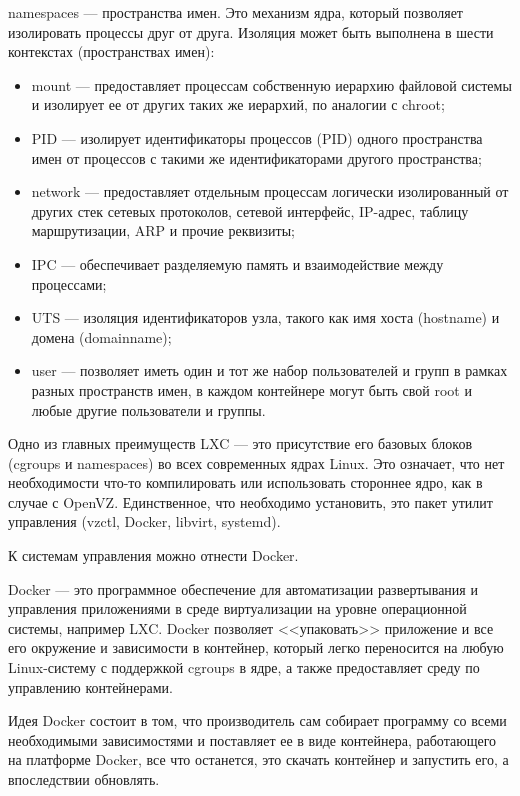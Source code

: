 namespaces --- пространства имен.
Это механизм ядра, который позволяет изолировать процессы друг от друга.
Изоляция может быть выполнена в шести контекстах (пространствах имен):
\begin{itemize}
  \item mount --- предоставляет процессам собственную иерархию файловой системы и изолирует ее от других таких же иерархий, по аналогии с chroot;
  \item PID --- изолирует идентификаторы процессов (PID) одного пространства имен от процессов с такими же идентификаторами другого пространства;
  \item network --- предоставляет отдельным процессам логически изолированный от других стек сетевых протоколов, сетевой интерфейс, IP-адрес, таблицу маршрутизации, ARP и прочие реквизиты;
  \item IPC --- обеспечивает разделяемую память и взаимодействие между процессами;
  \item UTS --- изоляция идентификаторов узла, такого как имя хоста (hostname) и домена (domainname);
  \item user --- позволяет иметь один и тот же набор пользователей и групп в рамках разных пространств имен, в каждом контейнере могут быть свой root и любые другие пользователи и группы.
\end{itemize}

Одно из главных преимуществ LXC --- это присутствие его базовых блоков (cgroups и namespaces) во всех современных ядрах Linux.
Это означает, что нет необходимости что-то компилировать или использовать стороннее ядро, как в случае с OpenVZ.
Единственное, что необходимо установить, это пакет утилит управления (vzctl, Docker, libvirt, systemd).

К системам управления можно отнести Docker.

Docker --- это программное обеспечение для автоматизации развертывания и управления приложениями в среде виртуализации на уровне операционной системы, например LXC.
Docker позволяет <<упаковать>> приложение и все его окружение и зависимости в контейнер, который легко переносится на любую Linux-систему с поддержкой cgroups в ядре, а также предоставляет среду по управлению контейнерами.

Идея Docker состоит в том, что производитель сам собирает программу со всеми необходимыми зависимостями и поставляет ее в виде контейнера, работающего на платформе Docker, все что останется, это скачать контейнер и запустить его, а впоследствии обновлять.

